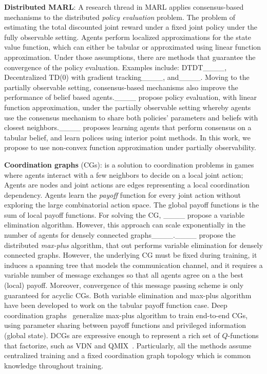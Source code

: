 \textbf{Distributed MARL}: A research thread in MARL applies consensus-based mechanisms to the distributed {\em policy evaluation} problem. The problem of estimating the total discounted joint reward under a fixed joint policy under the fully observable setting. Agents perform localized approximations for the state value function, which can either be tabular or approximated using linear function approximation. Under those assumptions, there are methods that guarantee the convergence of the policy evaluation. Examples include:  DTDT____, Decentralized TD(0) with gradient tracking____,  and____. Moving to the partially observable setting, consensus-based mechanisms also improve the performance of belief based agents.____ propose policy evaluation, with linear function approximation, under the partially observable setting whereby agents use the consensus mechanism to share both policies' parameters and beliefs with closest neighbors.____ proposes learning agents that perform consensus on a tabular belief, and learn polices using interior point methods. In this work, we propose to use non-convex function approximation under partially observability.

\textbf{Coordination graphs} (CGs): is  a solution to coordination problems in games where agents interact with a few neighbors to decide on a local joint action; Agents are nodes and joint actions are edges representing a local coordination dependency. Agents learn the {\em payoff} function for every joint action without exploring the large combinatorial action space. The global payoff functions is the sum of local payoff functions. For solving the CG, ____ propose a variable elimination algorithm. However, this approach  can scale exponentially in the number of agents for densely connected graphs____.____ propose the distributed {\em max-plus} algorithm, that out performs  variable elimination for densely connected graphs. However, the underlying CG must be fixed during training, it induces a spanning tree that models the communication channel, and it requires a variable number of message exchanges so that all agents agree on a the best (local) payoff. Moreover, convergence of this message passing scheme is only guaranteed for acyclic CGs. Both variable elimination and max-plus algorithm have been developed to work on the tabular payoff function case. Deep coordination graphs~\cite[DCGs,][]{bohmer_2020} generalize max-plus algorithm to train end-to-end CGs, using parameter sharing between payoff functions and privileged information (global state). DCGs are expressive  enough to represent a rich set of $Q$-functions that factorize, such as VDN and QMIX~\cite[QMIX,][]{rashid_2018}. Particularly, all the methods assume centralized training and a fixed coordination graph topology which is common knowledge throughout training.

